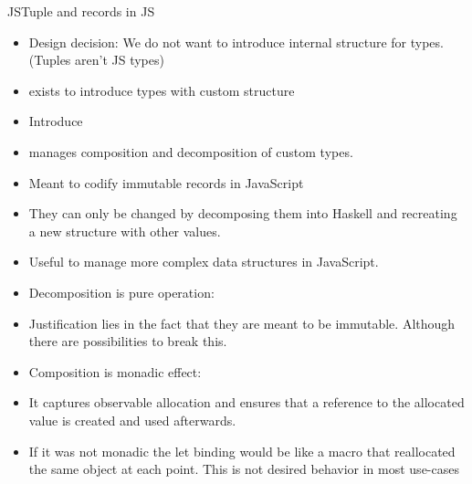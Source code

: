 JSTuple and records in JS
\begin{itemize}
\item Design decision: We do not want to introduce internal
structure for types. (Tuples aren't JS types)
\item {} exists to introduce types with custom structure
\item Introduce 
\item manages composition and decomposition of custom types.
\item Meant to codify immutable records in JavaScript
\item They can only be changed
by decomposing them into Haskell and recreating a new structure
with other values.
\item Useful to manage more complex data structures in JavaScript.
\item Decomposition is pure operation: 
\item Justification lies in the fact that they are meant to be 
immutable. Although there are possibilities to break this.
\item Composition is monadic effect: 
\item It captures observable allocation and ensures that a reference to the
allocated value is created and used afterwards.
\item If it was not monadic the let binding would be like a macro
that reallocated the same object at each point. This 
is not desired behavior in most use-cases
\end{itemize}







